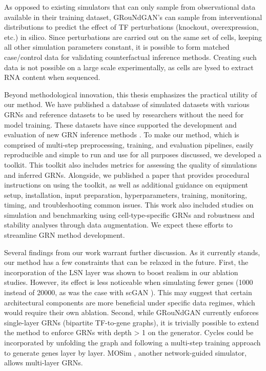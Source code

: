 As opposed to existing simulators that can only sample from observational data available in their training dataset, GRouNdGAN’s can sample from interventional distributions to predict the effect of TF perturbations (knockout, overexpression, etc.) in silico. Since perturbations are carried out on the same set of cells, keeping all other simulation parameters constant, it is possible to form matched case/control data for validating counterfactual inference methods. Creating such data is not possible on a large scale experimentally, as cells are lysed to extract RNA content when sequenced. 

Beyond methodological innovation, this thesis emphasizes the practical utility of our method. We have published a database of simulated datasets with various GRNs and reference datasets to be used by researchers without the need for model training. These datasets have since supported the development and evaluation of new GRN inference methods \cite{zandigohar2025scregulate, afonja2024llm4grn}. To make our method, which is comprised of multi-step preprocessing, training, and evaluation pipelines, easily reproducible and simple to run and use for all purposes discussed, we developed a toolkit. This toolkit also includes metrics for assessing the quality of simulations and inferred GRNs. Alongside, we published a paper that provides procedural instructions on using the toolkit, as well as additional guidance on equipment setup, installation, input preparation, hyperparameters, training, monitoring, timing, and troubleshooting common issues. This work also included studies on simulation and benchmarking using cell-type-specific GRNs and robustness and stability analyses through data augmentation. We expect these efforts to streamline GRN method development.

Several findings from our work warrant further discussion. As it currently stands, our method has a few constraints that can be relaxed in the future. First, the incorporation of the LSN layer was shown to boost realism in our ablation studies. However, its effect is less noticeable when simulating fewer genes (1000 instead of 20000, as was the case with scGAN \cite{marouf2020realistic}). This may suggest that certain architectural components are more beneficial under specific data regimes, which would require their own ablation. Second, while GRouNdGAN currently enforces single-layer GRNs (bipartite TF-to-gene graphs), it is trivially possible to extend the method to enforce GRNs with depth > 1 on the generator. Cycles could be incorporated by unfolding the graph and following a multi-step training approach to generate genes layer by layer. MOSim \cite{monzo2025mosim}, another network-guided simulator, allows multi-layer GRNs. 

